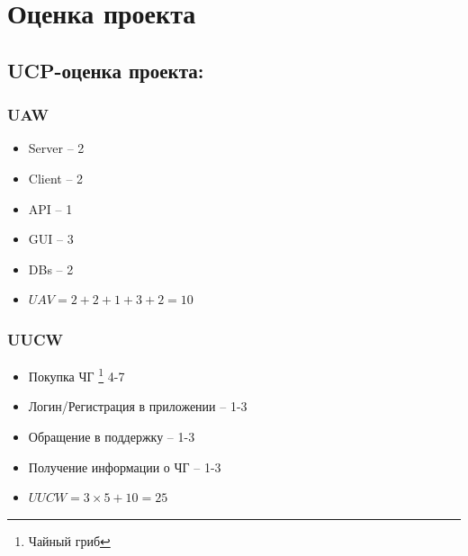 \documentclass[a4paper,8pt]{article}
\begin{document}
\section{Оценка проекта}



\subsection{UCP-оценка проекта:}

\subsubsection{UAW}
\begin{itemize}
  \item Server -- 2
  \item Client -- 2
  \item API -- 1
  \item GUI -- 3
  \item DBs -- 2
  \item $UAV =  2 + 2 + 1 + 3 + 2 = 10$
\end{itemize}

\subsubsection{UUCW}
\begin{itemize}
    \item Покупка ЧГ \footnote{Чайный гриб} 4-7
    \item Логин/Регистрация в приложении -- 1-3
    \item Обращение в поддержку -- 1-3
    \item Получение информации о ЧГ --  1-3
    \item $UUCW = 3 \times 5 + 10 = 25$
\end{itemize}
\end{document}
